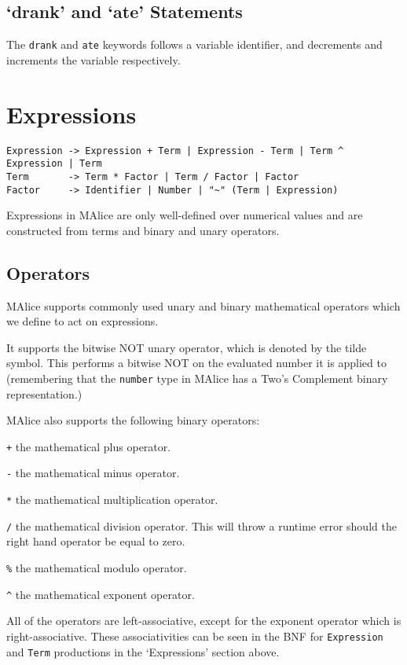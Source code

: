\documentclass[a4wide, 11pt]{article}
\begin{document}
\subsection{`drank' and `ate' Statements}

The \texttt{drank} and \texttt{ate} keywords follows a variable identifier, and decrements and increments the variable respectively.
  
\section{Expressions}

\begin{verbatim}
Expression -> Expression + Term | Expression - Term | Term ^ Expression | Term
Term       -> Term * Factor | Term / Factor | Factor
Factor     -> Identifier | Number | "~" (Term | Expression)

\end{verbatim}

Expressions in MAlice are only well-defined over numerical values and are constructed from terms and binary and unary operators.

\subsection{Operators}

MAlice supports commonly used unary and binary mathematical operators which we define to act on expressions.

It supports the bitwise NOT unary operator, which is denoted by the tilde symbol. This performs a bitwise NOT on the evaluated number it is applied to (remembering that the \texttt{number} type in MAlice has a Two's Complement binary representation.)

MAlice also supports the following binary operators:

\begin{list}{} {
\setlength{\labelsep}{0.75cm}
\setlength{\leftmargin}{2cm}
}

\item[\texttt{+}] the mathematical plus operator.
\item[\texttt{-}] the mathematical minus operator.
\item[\texttt{*}] the mathematical multiplication operator.
\item[\texttt{/}] the mathematical division operator. This will throw a runtime error should the right hand operator be equal to zero.
\item[\texttt{\%}] the mathematical modulo operator.
\item[\texttt{\^}] the mathematical exponent operator.

\end{list}

All of the operators are left-associative, except for the exponent operator which is right-associative. These associativities can be seen in the BNF for \texttt{Expression} and \texttt{Term} productions in the `Expressions' section above.
\end{document}
